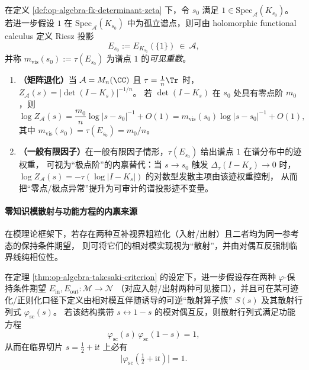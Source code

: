 \begin{remark}\label{rem:op-algebra-nc-zeta-visible-multiplicity}
在定义 \ref{def:op-algebra-fk-determinant-zeta} 下，令 \(s_0\) 满足 \(1\in\mathrm{Spec}_{\mathcal{A}}(K_{s_0})\)。
若进一步假设 \(1\) 在 \(\mathrm{Spec}_{\mathcal{A}}(K_{s_0})\) 中为孤立谱点，则可由 holomorphic functional calculus 定义 Riesz 投影
\[
E_{s_0}:=E_{K_{s_0}}(\{1\})\ \in\ \mathcal{A},
\]
并称
\(
m_{\mathrm{vis}}(s_0):=\tau(E_{s_0})
\)
为谱点 \(1\) 的\emph{可见重数}。
\begin{enumerate}
  \item \textbf{（矩阵退化）}当 \(\mathcal{A}=M_n(\CC)\) 且 \(\tau=\frac{1}{n}\Tr\) 时，
  \(Z_{\mathcal{A}}(s)=|\det(I-K_s)|^{-1/n}\)。
  若 \(\det(I-K_s)\) 在 \(s_0\) 处具有零点阶 \(m_0\)，则
  \[
  \log Z_{\mathcal{A}}(s)
  =\frac{m_0}{n}\log|s-s_0|^{-1}+O(1)
  =m_{\mathrm{vis}}(s_0)\log|s-s_0|^{-1}+O(1),
  \]
  其中 \(m_{\mathrm{vis}}(s_0)=\tau(E_{s_0})=m_0/n\)。
  \item \textbf{（一般有限因子）}在一般有限因子情形，\(\tau(E_{s_0})\) 给出谱点 \(1\) 在谱分布中的迹权重，
  可视为“极点阶”的内禀替代：当 \(s\to s_0\) 触发 \(\Delta_\tau(I-K_s)\to 0\) 时，
  \(\log Z_{\mathcal{A}}(s)=-\tau(\log|I-K_s|)\) 的对数型发散主项由该迹权重控制，
  从而把“零点/极点异常”提升为可审计的谱投影迹不变量。
\end{enumerate}
\end{remark}

\paragraph{零知识模散射与功能方程的内禀来源}
在模理论框架下，若存在两种互补视界粗粒化（入射/出射）且二者均为同一参考态的保持条件期望，
则可将它们的相对模实现视为“散射”，并由对偶互反强制临界线纯相位性。

\begin{proposition}[模散射行列式的反射对偶与临界线纯相位性]\label{prop:op-algebra-modular-scattering-phase}
在定理 \ref{thm:op-algebra-takesaki-criterion} 的设定下，进一步假设存在两种 \(\varphi\)-保持条件期望
\(
E_{\mathrm{in}},E_{\mathrm{out}}:\mathcal{M}\to\mathcal{N}
\)
（对应入射/出射两种可见接口），并且可在某可迹化/正则化口径下定义由相对模互伴随诱导的可逆“散射算子族” \(S(s)\) 及其散射行列式 \(\varphi_{\mathrm{sc}}(s)\)。
若该结构携带 \(s\leftrightarrow 1-s\) 的模对偶互反，则散射行列式满足功能方程
\begin{equation}\label{eq:op-algebra-scattering-fe}
\boxed{\;\varphi_{\mathrm{sc}}(s)\,\varphi_{\mathrm{sc}}(1-s)=1,\;}
\end{equation}
从而在临界切片 \(s=\tfrac12+\mathrm{i}t\) 上必有
\begin{equation}\label{eq:op-algebra-scattering-unit-modulus}
\boxed{\;\bigl|\varphi_{\mathrm{sc}}(\tfrac12+\mathrm{i}t)\bigr|=1.\;}
\end{equation}
\end{proposition}

